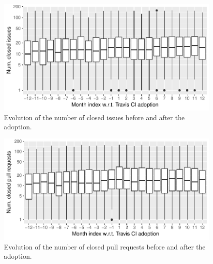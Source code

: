 



%
%




\begin{figure}[t]
\centering
\includegraphics[width=\columnwidth, clip=true, trim=0 0 0 0]{figures/issues.pdf}
\caption{Evolution of the number of closed issues before and after the \Tvis adoption.}
\label{fig:issues}
\end{figure}

\begin{figure}[t]
\centering
\includegraphics[width=\columnwidth, clip=true, trim=0 0 0 0]{figures/prs-full.pdf}
\caption{Evolution of the number of closed pull requests before and after the \Tvis adoption.}
\label{fig:prs}
\end{figure}


